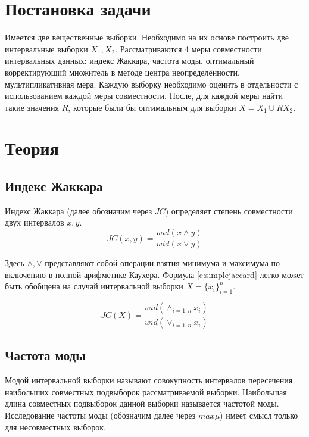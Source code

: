 \documentclass[a4paper,12pt]{article}
\begin{document}
    
    \newpage

    \tableofcontents
    \listoffigures
    \newpage

    \section{Постановка задачи}
    \quad Имеется две вещественные выборки.
    Необходимо на их основе построить две интервальные выборки $ X_{1}, X_{2} $.
    Рассматриваются 4 меры совместности интервальных данных: индекс Жаккара,
    частота моды, оптимальный корректирующий множитель в методе центра
    неопределённости, мультипликативная мера.
    Каждую выборку необходимо оценить в отдельности с использованием
    каждой меры совместности. После, для каждой меры найти такие значения $ R $, 
    которые были бы оптимальным для выборки $ X = X_{1} \cup R X_{2} $.

    \section{Теория}
    \subsection{Индекс Жаккара}
    \quad Индекс Жаккара (далее обозначим через $ JC $) определяет степень
    совместности двух интервалов $ x, y $.
    \begin{equation}
        JC(x, y) = \frac{wid(x \land y)}{wid(x \lor y)}
        \label{e:simplejaccard}
    \end{equation}

    Здесь $\land, \lor$ представляют собой операции взятия минимума и
    максимума по включению в полной арифметике Каухера.
    Формула \ref{e:simplejaccard} легко может быть обобщена на случай
    интервальной выборки $ X = \{x_i\}_{i=1}^{n} $.
    
    \begin{equation}
        JC(X) = \frac{wid(\land_{i=1,n}x_i)}{wid(\lor_{i=1,n}x_i)}
        \label{e:jaccard}
    \end{equation}

    \subsection{Частота моды}
    \quad Модой интервальной выборки называют совокупность интервалов
    пересечения наибольших совместных подвыборок рассматриваемой
    выборки. Наибольшая длина совместных подвыборок данной выборки называется
    частотой моды. Исследование частоты моды (обозначим далее через
    $ max\mu $) имеет смысл только для несовместных выборок.
\end{document}
